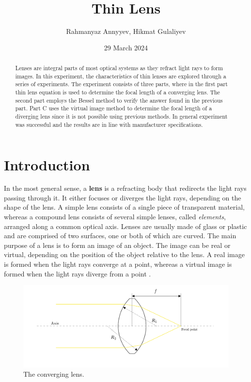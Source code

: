 \documentclass[10pt]{article}
\title{Thin Lens}
\author{Rahmanyaz Annyyev, Hikmat Gulaliyev}
\date{29 March 2024}
\begin{document}
\maketitle

\begin{abstract}
  Lenses are integral parts of most optical systems as they refract light rays to form images. In this experiment, the characteristics of thin lenses are explored through a series of experiments. The experiment consists of three parts, where in the first part thin lens equation is used to determine the focal length of a converging lens.
  The second part employs the Bessel method to verify the answer found in the previous part. Part C uses the virtual image method to determine the focal length of a diverging lens since it is not possible using previous methods. In general experiment was successful and the results are in line with manufacturer specifications. 
\end{abstract}

\section{Introduction}

In the most general sense, a \textbf{lens} is a refracting body that redirects the light rays passing through it. It either focuses or diverges the light rays, depending on the shape of the lens. A simple lens consists of a single piece of transparent material, whereas a compound lens consists of several simple lenses, called \textit{elements}, arranged along a common optical axis. Lenses are usually made of glass or plastic and are comprised of two surfaces, one or both of which are curved. The main purpose of a lens is to form an image of an object. The image can be real or virtual, depending on the position of the object relative to the lens. A real image is formed when the light rays converge at a point, whereas a virtual image is formed when the light rays diverge from a point \cite{Giancoli_2014}. 

\begin{figure}[hbt!]
  \centering
  \includegraphics[scale=0.5]{figures/f1.pdf}
  \caption{The converging lens.}
  \label{fig:1}
\end{figure}
\end{document}
